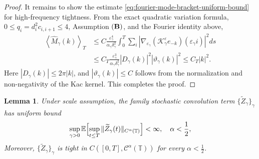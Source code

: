 \documentclass{article}
\newtheorem{lemma}{Lemma}
\begin{document}
\begin{proof}
It remains to show the estimate \eqref{eq:fourier-mode-bracket-uniform-bound} for high-frequency tightness.
From the exact quadratic variation formula, \(0\le q_i=d_i^2c_{i,i+1}\le4\),
Assumption \(({\bf B})\), and the Fourier identity above,
\[
\begin{aligned}
\left\langle \widehat M_\gamma(k)\right\rangle_T
&\le
C\frac{\varepsilon_\gamma^4}{\alpha_\gamma\delta_\gamma^2}
\int_0^T\sum_i
\left|
\nabla_{\varepsilon_\gamma}
(\mathcal K_\gamma^\varepsilon e_{-k})(\varepsilon_\gamma i)
\right|^2ds
\\
&\le
C_T\frac{\varepsilon_\gamma^3}{\alpha_\gamma\delta_\gamma^2}
|D_\gamma(k)|^2|\vartheta_\gamma(k)|^2
\le
C_T|k|^2 .
\end{aligned}
\]
Here \(|D_\gamma(k)|\le2\pi|k|\), and
\(|\vartheta_\gamma(k)|\le C\) follows from the normalization and
non-negativity of the Kac kernel.  This completes the proof.

\end{proof}


\begin{lemma}\label{lemma:ZgammaE}
Under scale assumption, the family stochastic convolution term \(\{\widetilde Z_\gamma\}_\gamma\) has uniform bound
\begin{align}\label{E:UZ_gamma}
    \sup_{\gamma >0 } \mathbb E
\Bigl[
\sup_{t\le T}\|\widetilde Z_\gamma(t)\|_{C^\alpha(\mathbb T)}
\Bigr]  <\infty, \quad \alpha <\frac{1}{2},
\end{align}
Moreover, \(\{\widetilde Z_\gamma\}_\gamma\) is tight in
\(
C([0,T],\mathcal C^\alpha(\mathbb T))
\)
for every \(\alpha<\frac12\).
\end{lemma}
\end{document}
